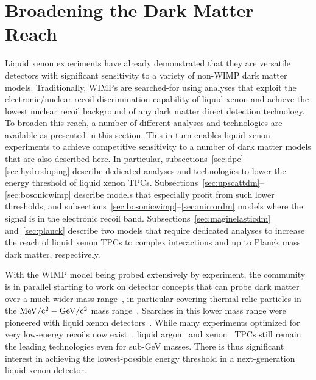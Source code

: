 \section{Broadening the Dark Matter Reach}\label{sec:broaderdarkmatter}

Liquid xenon experiments have already demonstrated that they are versatile detectors with significant sensitivity to a variety of non-WIMP dark matter models. Traditionally, WIMPs are searched-for using analyses that exploit the electronic/nuclear recoil discrimination capability of liquid xenon and achieve the lowest nuclear recoil background of any dark matter direct detection technology. To broaden this reach, a number of different analyses and technologies are available as presented in this section. This in turn enables liquid xenon experiments to achieve competitive sensitivity to a number of dark matter models that are also described here. In particular, subsections~\ref{sec:dpe}--\ref{sec:hydrodoping} describe dedicated analyses and technologies to lower the energy threshold of liquid xenon TPCs. Subsections~\ref{sec:upscattdm}--\ref{sec:bosonicwimp} describe models that especially profit from such lower thresholds, and subsections~\ref{sec:bosonicwimp}--\ref{sec:mirrordm} models where the signal is in the electronic recoil band. Subsections~\ref{sec:maginelasticdm} and~\ref{sec:planck} describe two models that require dedicated analyses to increase the reach of liquid xenon TPCs to complex interactions and up to Planck mass dark matter, respectively.

With the WIMP model being probed extensively by experiment, the community is in parallel starting to work on detector concepts that can probe dark matter over a much wider mass range~\cite{Battaglieri:2017aum}, in particular covering thermal relic particles in the $\mathrm{MeV/c^2}-\mathrm{GeV/c^2}$ mass range~\cite{Essig:2011nj,Essig:2013lka,Hochberg:2014dra,Kuflik:2015isi,Alexander:2016aln,Battaglieri:2017aum}. Searches in this lower mass range were pioneered with liquid xenon detectors~\cite{Essig:2012yx}. While many experiments optimized for very low-energy recoils now exist~\cite{Agnese:2015nto,Angloher:2015ewa,Petricca:2017zdp,Angloher:2017sxg,NEWS-G:2017pxg}, liquid argon~\cite{Agnes:2018ves,Agnes:2018oej} and xenon~\cite{Essig:2017kqs,Akerib:2018hck,Aprile:2019xxb} TPCs still remain the leading technologies even for sub-GeV masses. There is thus significant interest in achieving the lowest-possible energy threshold in a next-generation liquid xenon detector.


